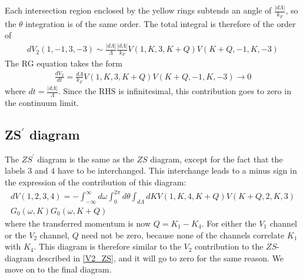 \documentclass[14pt]{extarticle}
\begin{document}
Each intersection region enclosed by the yellow rings subtends an angle of \(\frac{|d\Lambda|}{k_F}\), so the \(\theta\) integration is of the same order. The total integral is therefore of the order of
\begin{equation}\begin{aligned}
	dV_2(1,-1,3,-3) \sim \frac{|d\Lambda|}{\Lambda}\frac{|d\Lambda|}{k_F} V(1,K,3,K+Q) V(K+Q, -1, K, -3)
\end{aligned}\end{equation}
The RG equation takes the form
\begin{equation}\begin{aligned}
	\frac{d V_2}{dt} = \frac{d\Lambda}{k_F} V(1,K,3,K+Q) V(K+Q, -1, K, -3) \to 0
\end{aligned}\end{equation}
where \(dt = \frac{|d\Lambda|}{\Lambda}\). Since the RHS is infinitesimal, this contribution goes to zero in the continuum limit.
\subsection{ZS\(^\prime\) diagram}
The \(ZS^\prime\) diagram is the same as the \(ZS\) diagram, except for the fact that the labels \(3\) and \(4\) have to be interchanged. This interchange leads to a minus sign in the expression of the contribution of this diagram:
\begin{equation}\begin{aligned}
	dV(1,2,3,4) = -\int_{-\infty}^\infty d\omega  \int_0^{2\pi} d\theta \int_{d\Lambda}dK V(1,K,4,K+Q) V(K+Q, 2, K, 3)\\
	G_0(\omega, K)G_0(\omega, K+Q)
\end{aligned}\end{equation}
where the transferred momentum is now \(Q=K_1 - K_4\). For either the \(V_1\) channel or the \(V_2\) channel, \(Q\) need not be zero, because none of the channels correlate \(K_1\) with \(K_4\). This diagram is therefore similar to the \(V_2\) contribution to the \(ZS\)-diagram described in \ref{V2_ZS}, and it will go to zero for the same reason. We move on to the final diagram.
\end{document}
